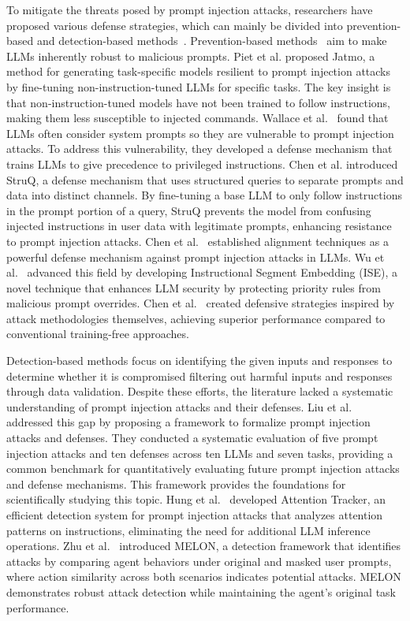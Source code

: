 To mitigate the threats posed by prompt injection attacks, researchers have proposed various defense strategies, which can mainly be divided into prevention-based and detection-based methods~\cite{299563}. 
Prevention-based methods~\cite{299563,piet2024jatmo,chen2024struq} aim to make LLMs inherently robust to malicious prompts. 
Piet et al. \cite{piet2024jatmo} proposed Jatmo, a method for generating task-specific models resilient to prompt injection attacks by fine-tuning non-instruction-tuned LLMs for specific tasks. The key insight is that non-instruction-tuned models have not been trained to follow instructions, making them less susceptible to injected commands.
Wallace et al.~\cite{wallace2024instruction} found that LLMs often consider system prompts so they are vulnerable to prompt injection attacks. To address this vulnerability, they developed a defense mechanism that trains LLMs to give precedence to privileged instructions.
Chen et al. \cite{chen2024struq} introduced StruQ, a defense mechanism that uses structured queries to separate prompts and data into distinct channels. By fine-tuning a base LLM to only follow instructions in the prompt portion of a query, StruQ prevents the model from confusing injected instructions in user data with legitimate prompts, enhancing resistance to prompt injection attacks.
Chen et al.~\cite{chen2024aligning} established alignment techniques as a powerful defense mechanism against prompt injection attacks in LLMs. 
Wu et al.~\cite{wu2024instructional} advanced this field by developing Instructional Segment Embedding (ISE), a novel technique that enhances LLM security by protecting priority rules from malicious prompt overrides. 
Chen et al.~\cite{chen2024defense} created defensive strategies inspired by attack methodologies themselves, achieving superior performance compared to conventional training-free approaches.

Detection-based methods \cite{299563,jain2023baseline,alon2023detecting} focus on identifying the given inputs and responses to determine whether it is compromised filtering out harmful inputs and responses through data validation.
Despite these efforts, the literature lacked a systematic understanding of prompt injection attacks and their defenses. Liu et al.~\cite{299563} addressed this gap by proposing a framework to formalize prompt injection attacks and defenses. They conducted a systematic evaluation of five prompt injection attacks and ten defenses across ten LLMs and seven tasks, providing a common benchmark for quantitatively evaluating future prompt injection attacks and defense mechanisms. This framework provides the foundations for scientifically studying this topic.  
Hung et al.~\cite{hung2024attention} developed Attention Tracker, an efficient detection system for prompt injection attacks that analyzes attention patterns on instructions, eliminating the need for additional LLM inference operations. Zhu et al.~\cite{zhu2025melonindirectpromptinjection} introduced MELON, a detection framework that identifies attacks by comparing agent behaviors under original and masked user prompts, where action similarity across both scenarios indicates potential attacks. MELON demonstrates robust attack detection while maintaining the agent's original task performance.


